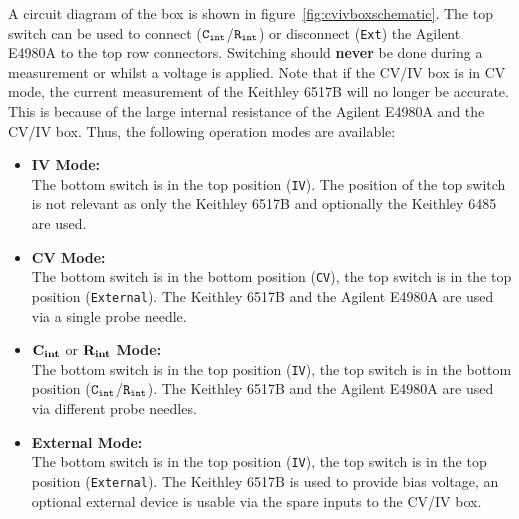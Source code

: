 \documentclass[a4paper]{article}
\begin{document}
A circuit diagram of the box is shown in figure~\ref{fig:cvivboxschematic}.
The top switch can be used to connect (${\tt C_{int}}$/${\tt R_{int}}$) or disconnect ({\tt Ext}) the Agilent E4980A to the top row connectors.
Switching should {\bf never} be done during a measurement or whilst a voltage is applied.
Note that if the CV/IV box is in CV mode, the current measurement of the Keithley 6517B will no longer be accurate.
This is because of the large internal resistance of the Agilent E4980A and the CV/IV box.
Thus, the following operation modes are available:\\

\begin{itemize}
\item{{\bf IV Mode:\\}}
The bottom switch is in the top position ({\tt IV}).
The position of the top switch is not relevant as only the Keithley 6517B and optionally the Keithley 6485 are used.

\item{{\bf CV Mode:\\}}
The bottom switch is in the bottom position ({\tt CV}), the top switch is in the top position ({\tt External}).
The Keithley 6517B and the Agilent E4980A are used via a single probe needle.

\item{${\rm {\bf C_{int}}}$ or ${\rm {\bf R_{int}}}$ {\bf Mode:\\}}
The bottom switch is in the top position ({\tt IV}), the top switch is in the bottom position (${\tt C_{int}}$/${\tt R_{int}}$).
The Keithley 6517B and the Agilent E4980A are used via different probe needles.

\item{{\bf External Mode:\\}}
The bottom switch is in the top position ({\tt IV}), the top switch is in the top position ({\tt External}).
The Keithley 6517B is used to provide bias voltage, an optional external device is usable via the spare inputs to the CV/IV box.
\end{itemize}
\end{document}
